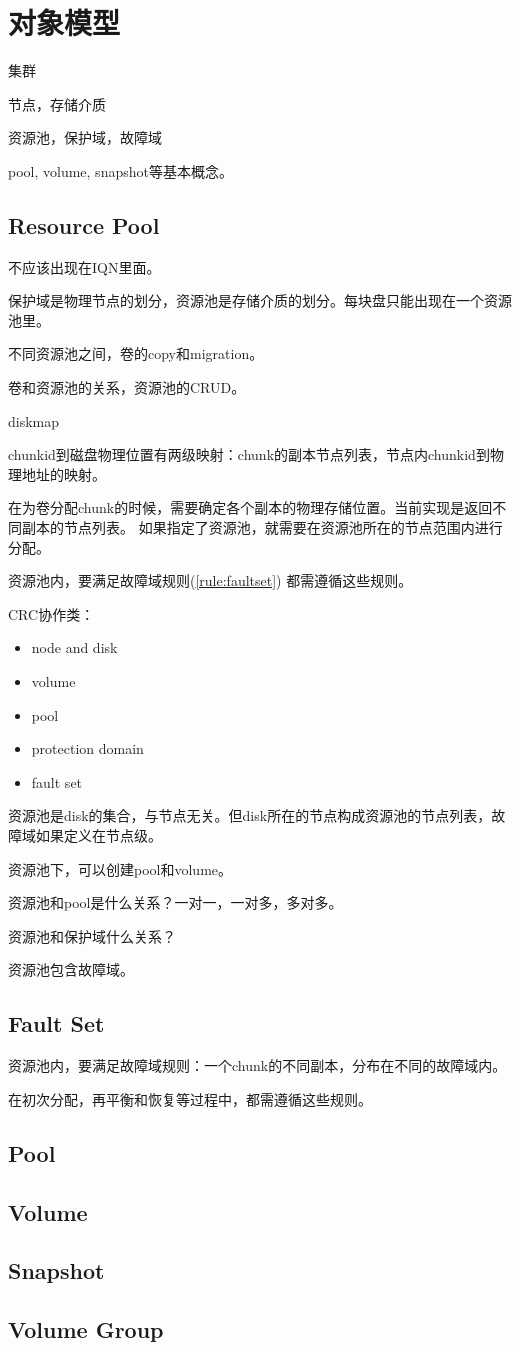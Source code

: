 \chapter{对象模型}

集群

节点，存储介质

资源池，保护域，故障域

pool, volume, snapshot等基本概念。

\section{Resource Pool}

不应该出现在IQN里面。

保护域是物理节点的划分，资源池是存储介质的划分。每块盘只能出现在一个资源池里。

不同资源池之间，卷的copy和migration。

卷和资源池的关系，资源池的CRUD。

diskmap

chunkid到磁盘物理位置有两级映射：chunk的副本节点列表，节点内chunkid到物理地址的映射。

在为卷分配chunk的时候，需要确定各个副本的物理存储位置。当前实现是返回不同副本的节点列表。
如果指定了资源池，就需要在资源池所在的节点范围内进行分配。

资源池内，要满足故障域规则(\ref{rule:faultset})
都需遵循这些规则。

CRC协作类：
\begin{itemize}
    \item node and disk
    \item volume
    \item pool
    \item protection domain
    \item fault set
\end{itemize}

资源池是disk的集合，与节点无关。但disk所在的节点构成资源池的节点列表，故障域如果定义在节点级。

资源池下，可以创建pool和volume。

资源池和pool是什么关系？一对一，一对多，多对多。

资源池和保护域什么关系？

资源池包含故障域。

\section{Fault Set}

资源池内，要满足故障域规则：一个chunk的不同副本，分布在不同的故障域内。\label{rule:faultset}

在初次分配，再平衡和恢复等过程中，都需遵循这些规则。

\section{Pool}
\section{Volume}
\section{Snapshot}
\section{Volume Group}
